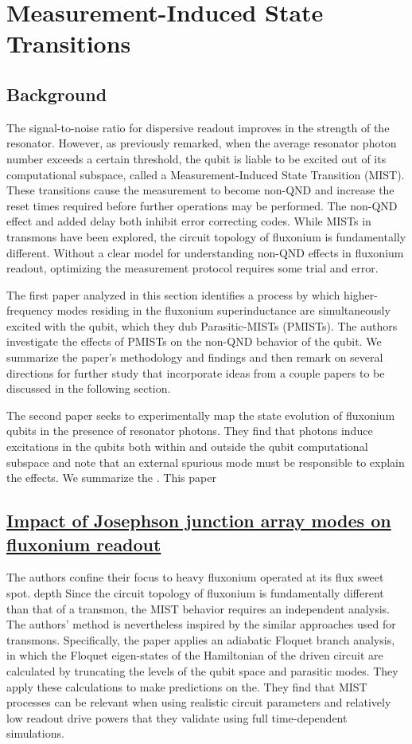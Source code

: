 \documentclass[
 reprint,
 superscriptaddress,
 bibnotes,
 amsmath,
 amssymb,
 aps,
 prb,
 citeautoscript,
 floatfix,
]{revtex4-2}
\begin{document}
\section{Measurement-Induced State Transitions}\label{sec3}

\subsection{Background}
The signal-to-noise ratio for dispersive readout improves in the strength of the resonator. However, as previously remarked, when the average resonator photon number exceeds a certain threshold, the qubit is liable to be excited out of its computational subspace, called a Measurement-Induced State Transition (MIST). These transitions cause the measurement to become non-QND and increase the reset times required before further operations may be performed. The non-QND effect and added delay both inhibit error correcting codes. While MISTs in transmons have been explored, the circuit topology of fluxonium is fundamentally different. Without a clear model for understanding non-QND effects in fluxonium readout, optimizing the measurement protocol requires some trial and error. 

The first paper analyzed in this section identifies a process by which higher-frequency modes residing in the fluxonium superinductance are simultaneously excited with the qubit, which they dub Parasitic-MISTs (PMISTs). The authors investigate the effects of PMISTs on the non-QND behavior of the qubit. We summarize the paper's methodology and findings and then remark on several directions for further study that incorporate ideas from a couple papers to be discussed in the following section. 

The second paper seeks to experimentally map the state evolution of fluxonium qubits in the presence of resonator photons. They find that photons induce excitations in the qubits both within and outside the qubit computational subspace and note that an external spurious mode must be responsible to explain the effects. We summarize the . This paper 

\subsection{\href{https://arxiv.org/abs/2412.14788}{Impact of Josephson junction array modes on fluxonium readout}}
 The authors confine their focus to heavy fluxonium operated at its flux sweet spot.  depth Since the circuit topology of fluxonium is fundamentally different than that of a transmon, the MIST behavior requires an independent analysis. The authors' method is nevertheless inspired by the similar approaches used for transmons. Specifically, the paper applies an adiabatic Floquet branch analysis, in which the Floquet eigen-states of the Hamiltonian of the driven circuit are calculated by truncating the levels of the qubit space and parasitic modes. They apply these calculations to make predictions on the. They find that MIST processes can be relevant when using realistic circuit parameters and relatively low readout drive powers that they validate using full time-dependent simulations. 
\end{document}
